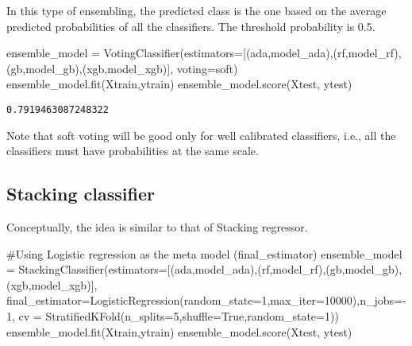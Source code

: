 \documentclass[
  letterpaper,
  DIV=11,
  numbers=noendperiod]{scrreprt}
\newenvironment{Shaded}{\begin{snugshade}}{\end{snugshade}}
\newcommand{\CommentTok}[1]{\textcolor[rgb]{0.37,0.37,0.37}{#1}}
\newcommand{\DecValTok}[1]{\textcolor[rgb]{0.68,0.00,0.00}{#1}}
\newcommand{\NormalTok}[1]{\textcolor[rgb]{0.00,0.23,0.31}{#1}}
\newcommand{\OperatorTok}[1]{\textcolor[rgb]{0.37,0.37,0.37}{#1}}
\newcommand{\StringTok}[1]{\textcolor[rgb]{0.13,0.47,0.30}{#1}}
\newcommand{\VariableTok}[1]{\textcolor[rgb]{0.07,0.07,0.07}{#1}}
\begin{document}
In this type of ensembling, the predicted class is the one based on the
average predicted probabilities of all the classifiers. The threshold
probability is 0.5.

\begin{Shaded}
\begin{Highlighting}[]
\NormalTok{ensemble\_model }\OperatorTok{=}\NormalTok{ VotingClassifier(estimators}\OperatorTok{=}\NormalTok{[(}\StringTok{\textquotesingle{}ada\textquotesingle{}}\NormalTok{,model\_ada),(}\StringTok{\textquotesingle{}rf\textquotesingle{}}\NormalTok{,model\_rf),(}\StringTok{\textquotesingle{}gb\textquotesingle{}}\NormalTok{,model\_gb),(}\StringTok{\textquotesingle{}xgb\textquotesingle{}}\NormalTok{,model\_xgb)],}
\NormalTok{                                 voting}\OperatorTok{=}\StringTok{\textquotesingle{}soft\textquotesingle{}}\NormalTok{)}
\NormalTok{ensemble\_model.fit(Xtrain,ytrain)}
\NormalTok{ensemble\_model.score(Xtest, ytest)}
\end{Highlighting}
\end{Shaded}

\begin{verbatim}
0.7919463087248322
\end{verbatim}

Note that soft voting will be good only for well calibrated classifiers,
i.e., all the classifiers must have probabilities at the same scale.

\subsection{Stacking classifier}\label{stacking-classifier}

Conceptually, the idea is similar to that of Stacking regressor.

\begin{Shaded}
\begin{Highlighting}[]
\CommentTok{\#Using Logistic regression as the meta model (final\_estimator)}
\NormalTok{ensemble\_model }\OperatorTok{=}\NormalTok{ StackingClassifier(estimators}\OperatorTok{=}\NormalTok{[(}\StringTok{\textquotesingle{}ada\textquotesingle{}}\NormalTok{,model\_ada),(}\StringTok{\textquotesingle{}rf\textquotesingle{}}\NormalTok{,model\_rf),(}\StringTok{\textquotesingle{}gb\textquotesingle{}}\NormalTok{,model\_gb),(}\StringTok{\textquotesingle{}xgb\textquotesingle{}}\NormalTok{,model\_xgb)],}
\NormalTok{                                   final\_estimator}\OperatorTok{=}\NormalTok{LogisticRegression(random\_state}\OperatorTok{=}\DecValTok{1}\NormalTok{,max\_iter}\OperatorTok{=}\DecValTok{10000}\NormalTok{),n\_jobs}\OperatorTok{={-}}\DecValTok{1}\NormalTok{,}
\NormalTok{                                   cv }\OperatorTok{=}\NormalTok{ StratifiedKFold(n\_splits}\OperatorTok{=}\DecValTok{5}\NormalTok{,shuffle}\OperatorTok{=}\VariableTok{True}\NormalTok{,random\_state}\OperatorTok{=}\DecValTok{1}\NormalTok{))}
\NormalTok{ensemble\_model.fit(Xtrain,ytrain)}
\NormalTok{ensemble\_model.score(Xtest, ytest)}
\end{Highlighting}
\end{Shaded}
\end{document}
